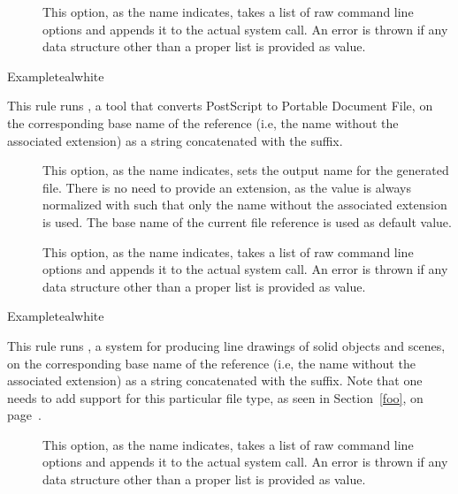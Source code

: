 \begin{description}
\begin{description}
\item[] This option, as the name indicates, takes a list of raw command line options and appends it to the actual system call. An error is thrown if any data structure other than a proper list is provided as value.
\end{description}

\begin{codebox}{Example}{teal}{\icnote}{white}
\end{codebox}

\item[\rulebox{ps2pdf}{Marco Daniel, Paulo Cereda}] This rule runs , a tool that converts PostScript to Portable Document File, on the corresponding base name of the  reference (i.e, the name without the associated extension) as a string concatenated with the  suffix.

\begin{description}
\item[] This option, as the name indicates, sets the output name for the generated  file. There is no need to provide an extension, as the value is always normalized with  such that only the name without the associated extension is used. The base name of the current file reference is used as default value.

\item[] This option, as the name indicates, takes a list of raw command line options and appends it to the actual system call. An error is thrown if any data structure other than a proper list is provided as value.
\end{description}

\begin{codebox}{Example}{teal}{\icnote}{white}
\end{codebox}

\item[\rulebox{sketch}{Sergey Ulyanov, Paulo Cereda}] This rule runs , a system for producing line drawings of solid objects and scenes, on the corresponding base name of the  reference (i.e, the name without the associated extension) as a string concatenated with the  suffix. Note that one needs to add support for this particular file type, as seen in Section~\ref{foo}, on page~\pageref{foo}.

\begin{description}
\item[] This option, as the name indicates, takes a list of raw command line options and appends it to the actual system call. An error is thrown if any data structure other than a proper list is provided as value.
\end{description}


\end{description}
